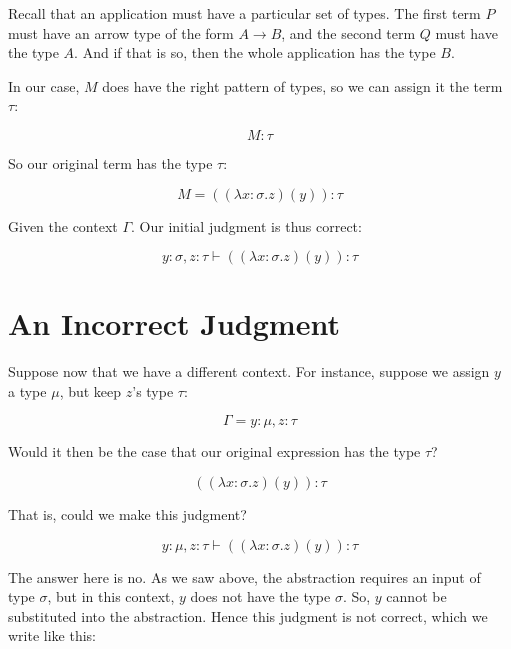 \documentclass{book}
\numberwithin{equation}{chapter}
\begin{document}
\noindent
Recall that an application must have a particular set of types. The first term $P$ must have an arrow type of the form $A \rightarrow B$, and the second term $Q$ must have the type $A$. And if that is so, then the whole application has the type $B$.

In our case, $M$ does have the right pattern of types, so we can assign it the term $\tau$:

\begin{equation}
M : \tau
\end{equation}

\noindent
So our original term has the type $\tau$:

\begin{equation}
M = ((\lambda x : \sigma.z) (y)) : \tau
\end{equation}

\noindent
Given the context $\Gamma$. Our initial judgment is thus correct:

\begin{equation}
y : \sigma, z : \tau \vdash ((\lambda x : \sigma.z) (y)) : \tau
\end{equation}


\section{An Incorrect Judgment}

Suppose now that we have a different context. For instance, suppose we assign $y$ a type $\mu$, but keep $z$'s type $\tau$:

\begin{equation}
\Gamma = y : \mu, z : \tau
\end{equation}

\noindent
Would it then be the case that our original expression has the type $\tau$?

\begin{equation}
((\lambda x : \sigma.z) (y)) : \tau
\end{equation}

\noindent
That is, could we make this judgment?

\begin{equation}
y : \mu, z : \tau \vdash ((\lambda x : \sigma.z) (y)) : \tau
\end{equation}

\noindent
The answer here is no. As we saw above, the abstraction requires an input of type $\sigma$, but in this context, $y$ does not have the type $\sigma$. So, $y$ cannot be substituted into the abstraction. Hence this judgment is not correct, which we write like this:
\end{document}
